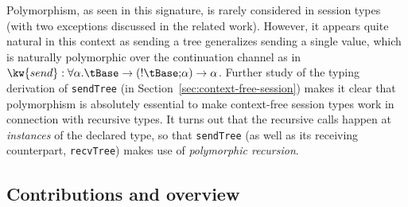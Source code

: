 Polymorphism, as seen in this signature, is rarely considered in session types
(with two exceptions \cite{BonoPadovaniTosatto13,DBLP:journals/mscs/Gay08} discussed in the related
work).  However, it appears quite natural in this context as sending a
tree generalizes sending a single value, which is naturally
polymorphic over the continuation channel as in $\kw{send} :\forall \alpha. \tBase \to
(\scCompose {\scSend\tBase}\alpha)
\to \alpha$.
%
Further study of the typing derivation of \lstinline|sendTree| (in
Section~\ref{sec:context-free-session}) makes it clear that
polymorphism is absolutely essential to make context-free session
types work in connection with recursive types. It turns out that the
recursive calls happen at \emph{instances} of the declared type, so
that \lstinline|sendTree| (as well as its receiving counterpart,
\lstinline|recvTree|) makes use of \emph{polymorphic recursion}.

\subsection*{Contributions and overview}
\label{sec:contributions}

